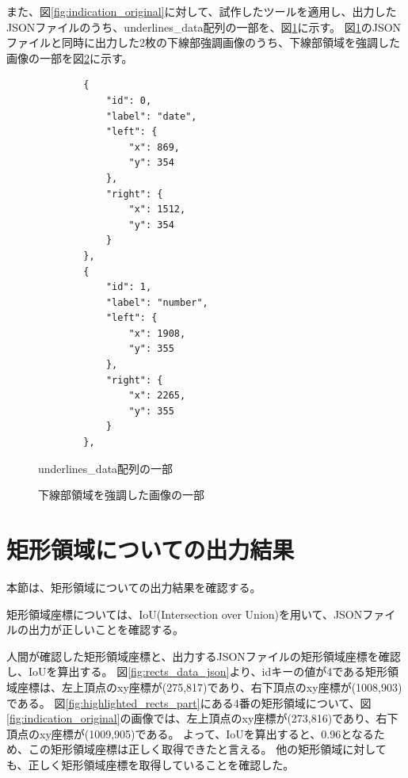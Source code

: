 また、図\ref{fig:indication_original}に対して、試作したツールを適用し、出力したJSONファイルのうち、underlines\_data配列の一部を、図\ref{fig:underlines_data_json}に示す。
図\ref{fig:underlines_data_json}のJSONファイルと同時に出力した2枚の下線部強調画像のうち、下線部領域を強調した画像の一部を図\ref{fig:highlighted_underlines_part}に示す。

\lstset{language=}
\begin{figure}[t]
    \begin{lstlisting}
        {
            "id": 0,
            "label": "date",
            "left": {
                "x": 869,
                "y": 354
            },
            "right": {
                "x": 1512,
                "y": 354
            }
        },
        {
            "id": 1,
            "label": "number",
            "left": {
                "x": 1908,
                "y": 355
            },
            "right": {
                "x": 2265,
                "y": 355
            }
        },
    \end{lstlisting}
    \caption{underlines\_data配列の一部}\label{fig:underlines_data_json}
\end{figure}

\begin{figure}[t]
    \begin{center}
        \caption{下線部領域を強調した画像の一部}
        \label{fig:highlighted_underlines_part}
    \end{center}
\end{figure}

\section{矩形領域についての出力結果}\label{sec:result_rect}
本節は、矩形領域についての出力結果を確認する。

矩形領域座標については、IoU(Intersection over Union)を用いて、JSONファイルの出力が正しいことを確認する。

人間が確認した矩形領域座標と、出力するJSONファイルの矩形領域座標を確認し、IoUを算出する。
図\ref{fig:rects_data_json}より、idキーの値が4である矩形領域座標は、左上頂点のxy座標が(275,817)であり、右下頂点のxy座標が(1008,903)である。
図\ref{fig:highlighted_rects_part}にある4番の矩形領域について、図\ref{fig:indication_original}の画像では、左上頂点のxy座標が(273,816)であり、右下頂点のxy座標が(1009,905)である。
よって、IoUを算出すると、0.96となるため、この矩形領域座標は正しく取得できたと言える。
他の矩形領域に対しても、正しく矩形領域座標を取得していることを確認した。

